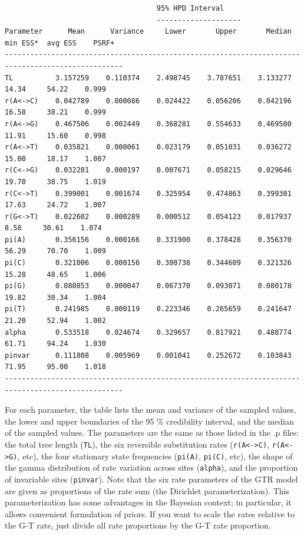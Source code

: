 \documentclass[12pt]{book}
\begin{document}
\begin{singlespacing}
\scriptsize
\begin{verbatim}
                                    95% HPD Interval
                                    --------------------
Parameter      Mean      Variance     Lower       Upper       Median    min ESS*  avg ESS    PSRF+ 
--------------------------------------------------------------------------------------------------
TL          3.157259    0.110374    2.498745    3.787651    3.133277     14.34     54.22    0.999
r(A<->C)    0.042789    0.000086    0.024422    0.056206    0.042196     16.58     38.21    0.999
r(A<->G)    0.467506    0.002449    0.368281    0.554633    0.469500     11.91     15.60    0.998
r(A<->T)    0.035821    0.000061    0.023179    0.051031    0.036272     15.00     18.17    1.007
r(C<->G)    0.032281    0.000197    0.007671    0.058215    0.029646     19.70     38.75    1.019
r(C<->T)    0.399001    0.001674    0.325954    0.474863    0.399301     17.63     24.72    1.007
r(G<->T)    0.022602    0.000289    0.000512    0.054123    0.017937      8.58     30.61    1.074
pi(A)       0.356156    0.000166    0.331900    0.378428    0.356370     56.29     70.70    1.009
pi(C)       0.321006    0.000156    0.300738    0.344609    0.321326     15.28     48.65    1.006
pi(G)       0.080853    0.000047    0.067370    0.093071    0.080178     19.82     30.34    1.004
pi(T)       0.241985    0.000119    0.223346    0.265659    0.241647     21.20     52.94    1.002
alpha       0.533518    0.024674    0.329657    0.817921    0.488774     61.71     94.24    1.030
pinvar      0.111808    0.005969    0.001041    0.252672    0.103843     71.95     95.00    1.018
--------------------------------------------------------------------------------------------------
\end{verbatim}
\normalsize
\end{singlespacing}

For each parameter, the table lists the mean and variance of the sampled values, the lower and
upper boundaries of the 95 \% credibility interval, and the median of the sampled values. The
parameters are the same as those listed in the .p files: the total tree length (\texttt{TL}), the
six reversible substitution rates (\texttt{r(A<->C)}, \texttt{r(A<->G)}, etc), the four stationary
state frequencies (\texttt{pi(A)}, \texttt{pi(C)}, etc), the shape of the gamma distribution of
rate variation across sites (\texttt{alpha}), and the proportion of invariable sites
(\texttt{pinvar}). Note that the six rate parameters of the GTR model are given as proportions of
the rate sum (the Dirichlet parameterization). This parameterization has some advantages in the
Bayesian context; in particular, it allows convenient formulation of priors. If you want to scale
the rates relative to the G-T rate, just divide all rate proportions by the G-T rate proportion.
\end{document}

